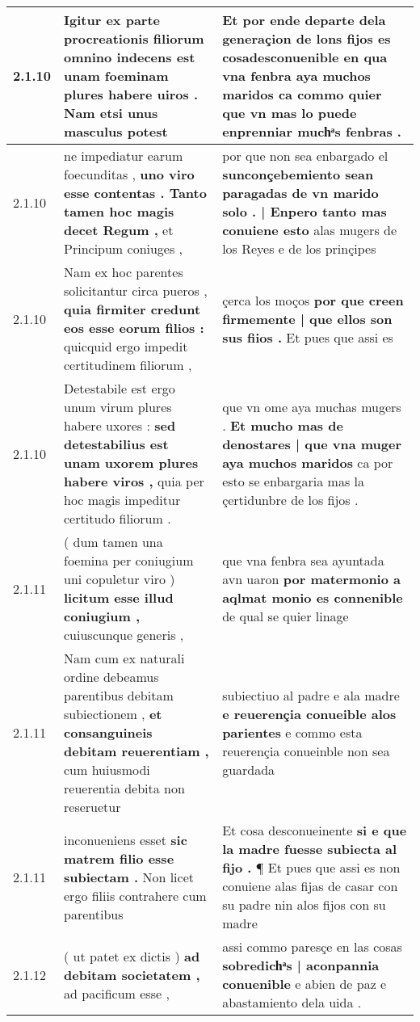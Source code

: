 \begin{tabular}{|p{1cm}|p{6.5cm}|p{6.5cm}|}
2.1.10 & Igitur ex parte procreationis filiorum omnino indecens est \textbf{ unam foeminam plures habere uiros . } Nam etsi unus masculus potest & Et por ende departe dela generaçion de lons fijos es \textbf{ cosadesconuenible en qua vna fenbra aya muchos maridos } ca commo quier que vn mas lo puede enprenniar muchͣs fenbras . \\\hline
2.1.10 & ne impediatur earum foecunditas , \textbf{ uno viro esse contentas . Tanto tamen hoc magis decet Regum , } et Principum coniuges , & por que non sea enbargado el \textbf{ sunconçebemiento sean paragadas de vn marido solo . | Enpero tanto mas conuiene esto } alas mugers de los Reyes e de los prinçipes \\\hline
2.1.10 & Nam ex hoc parentes solicitantur circa pueros , \textbf{ quia firmiter credunt eos esse eorum filios : } quicquid ergo impedit certitudinem filiorum , & çerca los moços \textbf{ por que creen firmemente | que ellos son sus fiios . } Et pues que assi es \\\hline
2.1.10 & Detestabile est ergo unum virum plures habere uxores : \textbf{ sed detestabilius est unam uxorem plures habere viros , } quia per hoc magis impeditur certitudo filiorum . & que vn ome aya muchas mugers . \textbf{ Et mucho mas de denostares | que vna muger aya muchos maridos } ca por esto se enbargaria mas la çertidunbre de los fijos . \\\hline
2.1.11 & ( dum tamen una foemina per coniugium uni copuletur viro ) \textbf{ licitum esse illud coniugium , } cuiuscunque generis , & que vna fenbra sea ayuntada avn uaron \textbf{ por matermonio a aqlmat monio es connenible } de qual se quier linage \\\hline
2.1.11 & Nam cum ex naturali ordine debeamus parentibus debitam subiectionem , \textbf{ et consanguineis debitam reuerentiam , } cum huiusmodi reuerentia debita non reseruetur & subiectiuo al padre e ala madre \textbf{ e reuerençia conueible alos parientes } e commo esta reuerençia conueinble non sea guardada \\\hline
2.1.11 & inconueniens esset \textbf{ sic matrem filio esse subiectam . } Non licet ergo filiis contrahere cum parentibus & Et cosa desconueinente \textbf{ si e que la madre fuesse subiecta al fijo . } ¶ Et pues que assi es non conuiene alas fijas de casar con su padre nin alos fijos con su madre \\\hline
2.1.12 & ( ut patet ex dictis ) \textbf{ ad debitam societatem , } ad pacificum esse , & assi commo paresçe en las cosas \textbf{ sobredichͣs | aconpannia conuenible } e abien de paz e abastamiento dela uida . \\\hline

\end{tabular}
